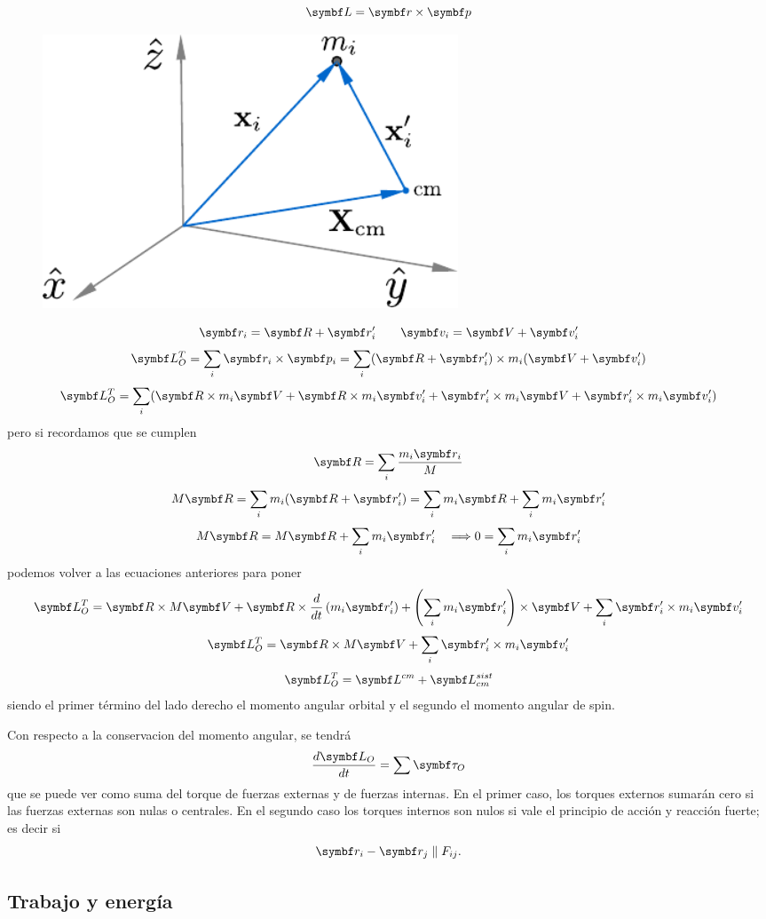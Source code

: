 \documentclass[10pt,oneside]{CBFT_book}
\begin{document}
\[
	\vb{L} = \vb{r} \times \vb{p}
\]
\begin{figure}[hbt]
	\begin{center}
	\includegraphics[width=0.6\textwidth]{images/fig_mc_angularmom.pdf}	
	\end{center}
	\caption{}
\end{figure} 
\[
	\vb{r}_i = \vb{R} + \vb{r}_i' \qquad \vb{v}_i = \vb{V} + \vb{v}_i'
\]
\[
	\vb{L}^T_O = \sum_i \vb{r}_i \times \vb{p}_i = \sum_i (\vb{R} + \vb{r}_i') \times m_i (\vb{V} + \vb{v}_i')
\]
\[
	\vb{L}^T_O = \sum_i ( \vb{R} \times m_i \vb{V}  + \vb{R} \times m_i \vb{v}_i'
	+ \vb{r}_i' \times m_i \vb{V} 	+ \vb{r}_i' \times m_i \vb{v}_i' )
\]
pero si recordamos que se cumplen 
\[
	\vb{R} = \sum_i \frac{m_i \vb{r}_i}{M}
\]
\[
	M\vb{R} = \sum_i m_i (\vb{R} + \vb{r}_i') = \sum_i m_i \vb{R} + \sum_i m_i \vb{r}_i'
\]
\[
	M\vb{R} = M \vb{R} + \sum_i m_i \vb{r}_i' \quad \Longrightarrow 0 = \sum_i m_i \vb{r}_i'
\]
podemos volver a las ecuaciones anteriores para poner
\[
	\vb{L}^T_O = \vb{R} \times M \vb{V}  + \vb{R} \times \frac{d}{dt}\left( m_i \vb{r}_i' \right)
	+ \left( \sum_i m_i \vb{r}_i' \right) \times \vb{V} + \sum_i \vb{r}_i' \times m_i \vb{v}_i'
\]
\[
	\vb{L}^T_O = \vb{R} \times M \vb{V}  + \sum_i \vb{r}_i' \times m_i \vb{v}_i'
\]
\[
	\vb{L}^T_O = \vb{L}^{cm} + \vb{L}^{sist}_{cm}
\]
siendo el primer término del lado derecho el momento angular orbital y el segundo el momento angular
de spin.

Con respecto a la conservacion del momento angular, se tendrá
\[
	\dtot{\vb{L}_O}{t} = \sum \vb{\tau}_O
\]
que se puede ver como suma del torque de fuerzas externas y de fuerzas internas. En el primer caso,
los torques externos sumarán cero si las fuerzas externas son nulas o centrales.
En el segundo caso los torques internos son nulos si vale el principio de acción y reacción fuerte;
es decir si
\[
	\vb{r}_i - \vb{r}_j \parallel F_{ij}.
\]

\subsection{Trabajo y energía}
\end{document}
